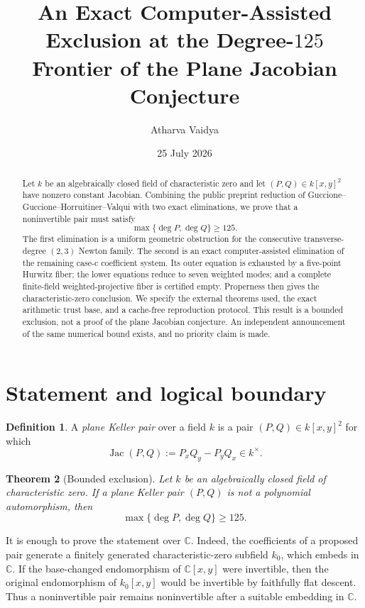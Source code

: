 \documentclass[11pt]{article}
\title{An Exact Computer-Assisted Exclusion at the Degree-\(125\)
Frontier of the Plane Jacobian Conjecture}
\author{Atharva Vaidya}
\date{25 July 2026}
\newtheorem{theorem}{Theorem}[section]
\theoremstyle{definition}
\newtheorem{definition}[theorem]{Definition}
\theoremstyle{remark}
\newcommand{\Jac}{\operatorname{Jac}}
\begin{document}
\maketitle

\begin{abstract}
Let \(k\) be an algebraically closed field of characteristic zero and let
\((P,Q)\in k[x,y]^2\) have nonzero constant Jacobian.  Combining the
public preprint reduction of Guccione--Guccione--Horruitiner--Valqui
with two exact eliminations, we prove that a noninvertible pair must satisfy
\[
   \max\{\deg P,\deg Q\}\geq 125.
\]
The first elimination is a uniform geometric obstruction for the
consecutive transverse-degree \((2,3)\) Newton family.  The second is an
exact computer-assisted elimination of the remaining case-c coefficient
system.  Its outer equation is exhausted by a five-point Hurwitz fiber;
the lower equations reduce to seven weighted modes; and a complete
finite-field weighted-projective fiber is certified empty.  Properness
then gives the characteristic-zero conclusion.  We specify the external
theorems used, the exact arithmetic trust base, and a cache-free
reproduction protocol.  This result is a bounded exclusion, not a proof
of the plane Jacobian conjecture.  An independent announcement of the
same numerical bound exists, and no priority claim is made.
\end{abstract}

\section{Statement and logical boundary}

\begin{definition}
A \emph{plane Keller pair} over a field \(k\) is a pair
\((P,Q)\in k[x,y]^2\) for which
\[
  \Jac(P,Q):=P_xQ_y-P_yQ_x\in k^\times.
\]
\end{definition}

\begin{theorem}[Bounded exclusion]\label{thm:main}
Let \(k\) be an algebraically closed field of characteristic zero.  If a
plane Keller pair \((P,Q)\) is not a polynomial automorphism, then
\[
  \max\{\deg P,\deg Q\}\geq 125.
\]
\end{theorem}

It is enough to prove the statement over \(\mathbb C\).  Indeed, the
coefficients of a proposed pair generate a finitely generated
characteristic-zero subfield \(k_0\), which embeds in \(\mathbb C\).
If the base-changed endomorphism of \(\mathbb C[x,y]\) were invertible,
then the original endomorphism of \(k_0[x,y]\) would be invertible by
faithfully flat descent.  Thus a noninvertible pair remains
noninvertible after a suitable embedding in \(\mathbb C\).
\end{document}
